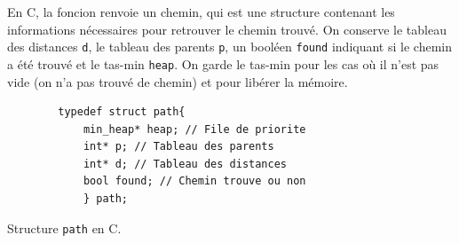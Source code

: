 En C, la foncion renvoie un chemin, qui est une structure contenant les informations nécessaires pour retrouver le chemin trouvé.
\newline\newline
On conserve le tableau des distances \texttt{d}, le tableau des parents \texttt{p}, un booléen \texttt{found} indiquant si le chemin a été trouvé et le tas-min \texttt{heap}.
On garde le tas-min pour les cas où il n'est pas vide (on n'a pas trouvé de chemin) et pour libérer la mémoire.

\begin{listing}[!htpb]
    \begin{verbatim}
        typedef struct path{
            min_heap* heap; // File de priorite
            int* p; // Tableau des parents
            int* d; // Tableau des distances
            bool found; // Chemin trouve ou non
            } path;
    \end{verbatim}
    \caption{Structure \texttt{path} en C.}
    \label{listing:c-path}
\end{listing}